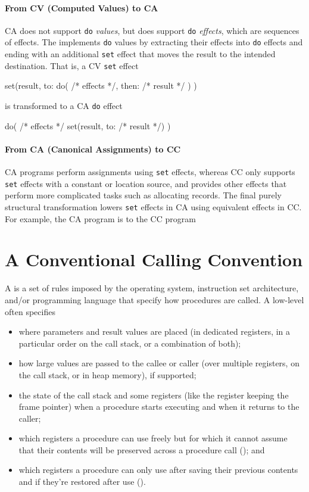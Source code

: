 \documentclass[main.tex]{subfiles}
\begin{document}
\paragraph{From CV (Computed Values) to CA} CA does not support \texttt{do} \emph{values}, but does support \texttt{do} \emph{effects}, which are sequences of effects. The  implements \texttt{do} values by extracting their effects into \texttt{do} effects and ending with an additional \texttt{set} effect that moves the result to the intended destination. That is, a CV \texttt{set} effect
\begin{il}
	set(result, to:
		do(
			/* effects */,
			then: /* result */
		)
	)
\end{il}
is transformed to a CA \texttt{do} effect
\begin{il}
	do(
		/* effects */
		set(result, to: /* result */)
	)
\end{il}

\paragraph{From CA (Canonical Assignments) to CC} CA programs perform assignments using \texttt{set} effects, whereas CC only supports \texttt{set} effects with a constant or location source, and provides other effects that perform more complicated tasks such as allocating records. The final purely structural transformation lowers \texttt{set} effects in CA using equivalent effects in CC. For example, the CA program
is \lowered{} to the CC program

\section{A Conventional Calling Convention} \label{sct:cc}
A  is a set of rules imposed by the operating system, instruction set architecture, and/or programming language that specify how procedures are called. A low-level  often specifies
\begin{itemize}[noitemsep]
	\item where parameters and result values are placed (in dedicated registers, in a particular order on the call stack, or a combination of both);
	\item how large values are passed to the callee or caller (over multiple registers, on the call stack, or in heap memory), if supported;
	\item the state of the call stack and some registers (like the register keeping the frame pointer) when a procedure starts executing and when it returns to the caller;
	\item which registers a procedure can use freely but for which it cannot assume that their contents will be preserved across a procedure call (\textbf{}); and
	\item which registers a procedure can only use after saving their previous contents and if they're restored after use (\textbf{}).
\end{itemize}
\end{document}
